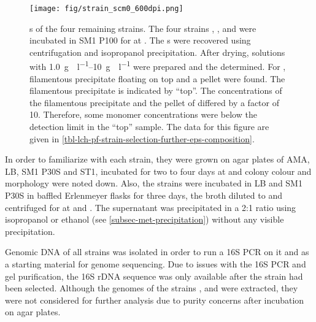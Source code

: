 \begin{figure}
	\begin{center}
		\texttt{[image: fig/strain\_scm0\_600dpi.png]}
		\caption[\EPS{} \AMC{}s of the Four Remaining Strains]{\EPS{} \amc{}s of the four remaining strains. The four strains , ,  and  were incubated in  SM1 P100 for  at . The \eps{}s were recovered using centrifugation and isopropanol precipitation. After drying, solutions with \SIrange{1.0}{10}{\gram\eps\per\litre} were prepared and the \amc{} determined.  For , filamentous precipitate floating on top and a pellet were found. The filamentous precipitate is indicated by \enquote{top}. The concentrations of the filamentous precipitate and the pellet of  differed by a factor of 10. Therefore, some monomer concentrations were below the detection limit in the \enquote{top} sample. The data for this figure are given in \vref{tbl-lch-pf-strain-selection-further-eps-composition}.\label{fig-lch-pf-strain-selection-further-eps-composition}}
	\end{center}
\end{figure}

In order to familiarize with each strain, they were grown on agar plates of AMA, LB, SM1 P30S and ST1, incubated for two to four days at  and colony colour and morphology were noted down. Also, the strains were incubated in  LB and SM1 P30S in  baffled Erlenmeyer flasks for three days, the broth diluted to  and centrifuged for  at  and . The supernatant was precipitated in a 2:1 ratio using isopropanol or ethanol (see \vref{subsec-met-precipitation}) without any visible precipitation.

Genomic DNA of all strains was isolated in order to run a 16S PCR on it and as a starting material for genome sequencing. Due to issues with the 16S PCR and gel purification, the 16S rDNA sequence was only available after the strain had been selected. Although the genomes of the strains ,  and  were extracted, they were not considered for further analysis due to purity concerns after incubation on agar plates.

